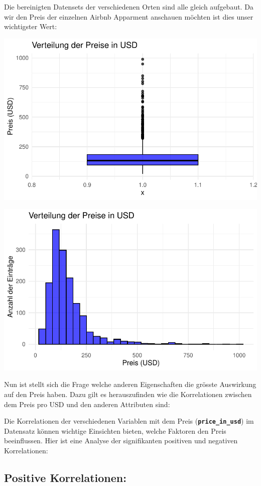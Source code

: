 \documentclass[
  journal,
]{IEEEtran}%
\begin{document}
Die bereinigten Datensets der verschiedenen Orten sind alle gleich
aufgebaut. Da wir den Preis der einzelnen Airbnb Apparment anschauen
möchten ist dies unser wichtigster Wert:

\includegraphics{main_files/figure-pdf/unnamed-chunk-6-1.pdf}

\includegraphics{main_files/figure-pdf/unnamed-chunk-6-2.pdf}

Nun ist stellt sich die Frage welche anderen Eigenschaften die grösste
Auswirkung auf den Preis haben. Dazu gilt es herauszufinden wie die
Korrelationen zwischen dem Preis pro USD und den anderen Attributen
sind:

Die Korrelationen der verschiedenen Variablen mit dem Preis
(\textbf{\texttt{price\_in\_usd}}) im Datensatz können wichtige
Einsichten bieten, welche Faktoren den Preis beeinflussen. Hier ist eine
Analyse der signifikanten positiven und negativen Korrelationen:

\hypertarget{positive-korrelationen}{%
\subsection{\texorpdfstring{\textbf{Positive
Korrelationen:}}{Positive Korrelationen:}}\label{positive-korrelationen}}
\end{document}
